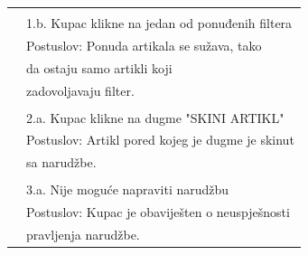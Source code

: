 \documentclass{scrreprt}
\begin{document}
\begin{center}
\begin{tabular}{|l|l|}
	&\\

	& 1.b. Kupac klikne na jedan od ponuđenih filtera \\
	& Postuslov: Ponuda artikala se sužava, tako \\
	& \hspace{50pt} da ostaju samo artikli koji \\
	& \hspace{50pt} zadovoljavaju filter. \\

	&\\

	& 2.a. Kupac klikne na dugme "SKINI ARTIKL" \\
	& Postuslov: Artikl pored kojeg je dugme je skinut \\
	& \hspace{50pt} sa narudžbe. \\

	&\\

	& 3.a. Nije moguće napraviti narudžbu \\
	& Postuslov: Kupac je obaviješten o neuspješnosti \\
	& \hspace{51pt} pravljenja narudžbe. \\

	\hline

\end{tabular}
\end{center}
\end{document}
